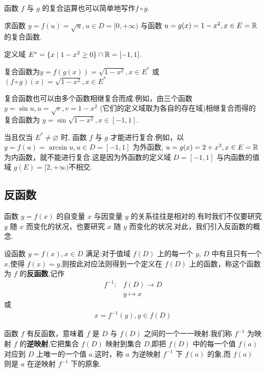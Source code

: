 函数 $f$ 与 $g$ 的复合运算也可以简单地写作$f\circ g$.

\begin{example}
    求函数 $y=f(u)=\sqrt{u},u\in D=[0,+\infty)$ 与函数 $u=g(x)=1-x^2,x\in E=\mathbb{R}$ 的复合函数.
\end{example}

\begin{solve}
    定义域 $E^*=\{x\mid1-x^2\ge 0\} \cap \mathbb{R}=[-1,1]$.

    复合函数为$y=f(g(x))=\sqrt{1-x^2},x\in E^*$ 或 $(f\circ g)(x)=\sqrt{1-x^2},x\in E^*$ 
\end{solve}

复合函数也可以由多个函数相继复合而成.例如，由三个函数 $y=\sin u,u=\sqrt{v},v=1-x^2$ (它们的定义域取为各自的存在域)相继复合而得的复合函数为 $y=\sin \sqrt{1-x^2},x\in [-1,1]$.

\begin{annotation}
    当且仅当 $E^*\ne \varnothing$ 时, 函数 $f$ 与 $g$ 才能进行复合.例如，以 $y=f(u)=\arcsin u,u\in D=[-1,1]$ 为外函数, $u=g(x)=2+x^2,x\in E=\mathbb{R}$ 为内函数，就不能进行复合.这是因为外函数的定义域 $D=[-1,1]$ 与内函数的值域 $g(E)=[2,+\infty)$不相交.
\end{annotation}

\subsection{反函数}

函数 $y=f(x)$ 的自变量 $x$ 与因变量 $y$ 的关系往往是相对的.有时我们不仅要研究 $y$ 随 $x$ 而变化的状况，也要研究 $x$ 随 $y$ 而变化的状况.对此，我们引入反函数的概念.

\begin{definition}[反函数]
    设函数 $y=f(x),x\in D$ 满足:对于值域 $f(D)$ 上的每一个 $y$, $D$ 中有且只有一个 $x$,使得 $f(x)=y$,则按此对应法则得到一个定义在 $f(D)$ 上的函数，称这个函数为 $f$ 的\textbf{反函数},记作
    \begin{align*}
        f^{-1}:&f(D)\to D \\ 
        & y \mapsto x
    \end{align*}
    或\begin{align}\label{eq:inv}
        x=f^{-1}(y),y\in f(D)
    \end{align} 
\end{definition}

\begin{annotation}
    函数 $f$ 有反函数，意味着 $f$ 是 $D$ 与 $f(D)$ 之间的一个一一映射.我们称 $f^{-1}$ 为映射 $f$ 的\textbf{逆映射},它把集合 $f(D)$ 映射到集合 $D$,即把 $f(D)$ 中的每一个值 $f(a)$ 对应到 $D$ 上唯一的一个值 $a$.这时，称 $a$ 为逆映射 $f^{-1}$ 下 $f(a)$ 的象,而 $f(a)$ 则是 $a$ 在逆映射 $f^{-1}$ 下的原象.
\end{annotation}

